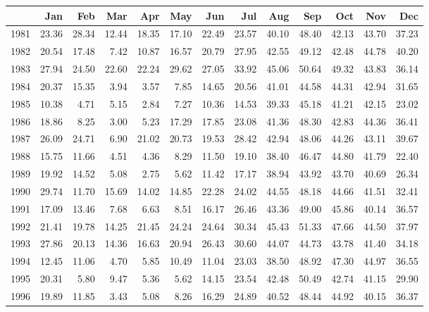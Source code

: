 \begin{table}[ht]
\centering
\begin{tabular}{rrrrrrrrrrrrr}
  \hline
 & Jan & Feb & Mar & Apr & May & Jun & Jul & Aug & Sep & Oct & Nov & Dec \\ 
  \hline
1981 & 23.36 & 28.34 & 12.44 & 18.35 & 17.10 & 22.49 & 23.57 & 40.10 & 48.40 & 42.13 & 43.70 & 37.23 \\ 
  1982 & 20.54 & 17.48 & 7.42 & 10.87 & 16.57 & 20.79 & 27.95 & 42.55 & 49.12 & 42.48 & 44.78 & 40.20 \\ 
  1983 & 27.94 & 24.50 & 22.60 & 22.24 & 29.62 & 27.05 & 33.92 & 45.06 & 50.64 & 49.32 & 43.83 & 36.14 \\ 
  1984 & 20.37 & 15.35 & 3.94 & 3.57 & 7.85 & 14.65 & 20.56 & 41.01 & 44.58 & 44.31 & 42.94 & 31.65 \\ 
  1985 & 10.38 & 4.71 & 5.15 & 2.84 & 7.27 & 10.36 & 14.53 & 39.33 & 45.18 & 41.21 & 42.15 & 23.02 \\ 
  1986 & 18.86 & 8.25 & 3.00 & 5.23 & 17.29 & 17.85 & 23.08 & 41.36 & 48.30 & 42.83 & 44.36 & 36.41 \\ 
  1987 & 26.09 & 24.71 & 6.90 & 21.02 & 20.73 & 19.53 & 28.42 & 42.94 & 48.06 & 44.26 & 43.11 & 39.67 \\ 
  1988 & 15.75 & 11.66 & 4.51 & 4.36 & 8.29 & 11.50 & 19.10 & 38.40 & 46.47 & 44.80 & 41.79 & 22.40 \\ 
  1989 & 19.92 & 14.52 & 5.08 & 2.75 & 5.62 & 11.42 & 17.17 & 38.94 & 43.92 & 43.70 & 40.69 & 26.34 \\ 
  1990 & 29.74 & 11.70 & 15.69 & 14.02 & 14.85 & 22.28 & 24.02 & 44.55 & 48.18 & 44.66 & 41.51 & 32.41 \\ 
  1991 & 17.09 & 13.46 & 7.68 & 6.63 & 8.51 & 16.17 & 26.46 & 43.36 & 49.00 & 45.86 & 40.14 & 36.57 \\ 
  1992 & 21.41 & 19.78 & 14.25 & 21.45 & 24.24 & 24.64 & 30.34 & 45.43 & 51.33 & 47.66 & 44.50 & 37.97 \\ 
  1993 & 27.86 & 20.13 & 14.36 & 16.63 & 20.94 & 26.43 & 30.60 & 44.07 & 44.73 & 43.78 & 41.40 & 34.18 \\ 
  1994 & 12.45 & 11.06 & 4.70 & 5.85 & 10.49 & 11.04 & 23.03 & 38.50 & 48.92 & 47.30 & 44.97 & 36.55 \\ 
  1995 & 20.31 & 5.80 & 9.47 & 5.36 & 5.62 & 14.15 & 23.54 & 42.48 & 50.49 & 42.74 & 41.15 & 29.90 \\ 
  1996 & 19.89 & 11.85 & 3.43 & 5.08 & 8.26 & 16.29 & 24.89 & 40.52 & 48.44 & 44.92 & 40.15 & 36.37 \\ 

\end{tabular}
\end{table}
